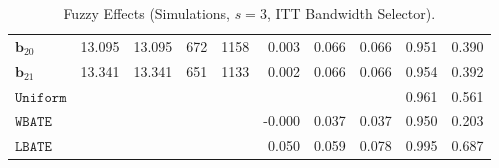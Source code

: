 \documentclass[10pt]{article}
\newcommand{\bb}{\mathbf{b}}
\begin{document}
\begin{table}[p]
\begin{tabular}{lccccrrrrr}
$\bb_{20}$ & 13.095 & 13.095 & 672 & 1158 & 0.003 & 0.066 & 0.066 & 0.951 & 0.390 \\
$\bb_{21}$ & 13.341 & 13.341 & 651 & 1133 & 0.002 & 0.066 & 0.066 & 0.954 & 0.392 \\
\midrule
$\mathtt{Uniform}$ &  &  &  &  &  &  &  & 0.961 & 0.561 \\
\midrule
$\mathtt{WBATE}$ &  &  &  &  & -0.000 & 0.037 & 0.037 & 0.950 & 0.203 \\
\midrule
$\mathtt{LBATE}$ &  &  &  &  & 0.050 & 0.059 & 0.078 & 0.995 & 0.687 \\
\bottomrule\bottomrule
\end{tabular}

    \caption{Fuzzy Effects (Simulations, $s=3$, ITT Bandwidth Selector).}
    \label{tab:sa-simuls-fuzzy-s3}
\end{table}

\clearpage
\end{document}
